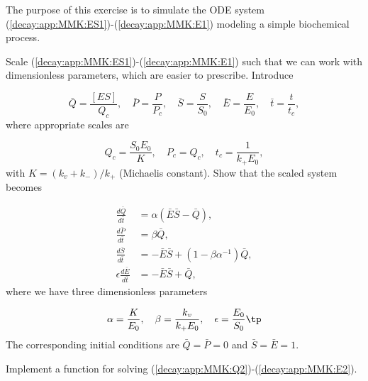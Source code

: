 \documentclass[graybox,sectrefs,envcountresetchap,open=right,final]{svmonodo}
\makeatletter
\newenvironment{doconceexercise}{}{}
\newcounter{doconceexercisecounter}%
\newcommand\listofexercises{
\chapter*{List of Exercises, Problems, and Projects
          \@mkboth{List of Exercises, Problems, and Projects}{List of Exercises, Problems, and Projects}}
\markboth{List of Exercises, Problems, and Projects}{List of Exercises, Problems, and Projects}
\@starttoc{loe}
}
\makeatother
\begin{document}
\begin{doconceexercise}

                
\label{decay:app:exer:MMK}

The purpose of this exercise is to simulate the ODE system
(\ref{decay:app:MMK:ES1})-(\ref{decay:app:MMK:E1}) modeling a simple
biochemical process.

Scale (\ref{decay:app:MMK:ES1})-(\ref{decay:app:MMK:E1}) such that
we can work with dimensionless parameters, which are easier to prescribe.
Introduce

\[ \bar Q = \frac{[ES]}{Q_c},\quad
\bar P = \frac{P}{P_c},\quad \bar S = \frac{S}{S_0},\quad \bar E = \frac{E}{E_0},\quad \bar t = \frac{t}{t_c},\]
where appropriate scales are

\[ Q_c = \frac{S_0E_0}{K},\quad P_c = Q_c, \quad t_c=\frac{1}{k_+E_0},\]
with $K=(k_v+k_-)/k_+$ (Michaelis constant). Show that the scaled
system becomes

\begin{align}
\frac{d\bar Q}{d\bar t} &= \alpha (\bar E\bar S
- \bar Q),
\label{decay:app:MMK:Q2}\\ 
\frac{d\bar P}{d\bar t} &= \beta\bar Q,
\label{decay:app:MMK:P2}\\ 
\frac{d\bar S}{d\bar t} &= -\bar E\bar S
+ (1 - \beta\alpha^{-1})\bar Q,
\label{decay:app:MMK:S2}\\ 
\epsilon\frac{d\bar E}{d\bar t} &= -\bar E\bar S + \bar Q,
\label{decay:app:MMK:E2}
\end{align}
where we have three dimensionless parameters

\[ \alpha = \frac{K}{E_0},\quad \beta = \frac{k_v}{k_+ E_0},\quad
\epsilon = \frac{E_0}{S_0}\tp
\]
The corresponding initial conditions are $\bar Q=\bar P=0$ and
$\bar S=\bar E=1$.



Implement a function for
solving (\ref{decay:app:MMK:Q2})-(\ref{decay:app:MMK:E2}).



\end{doconceexercise}
\end{document}
